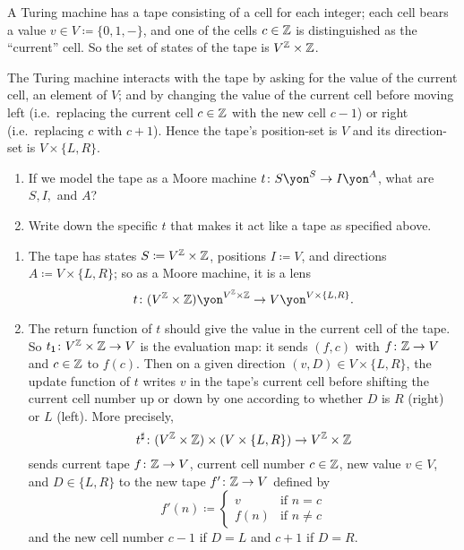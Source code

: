 \documentclass[Book-Poly]{subfiles}
\begin{document}
\begin{exercise}
A Turing machine has a tape consisting of a cell for each integer; each cell bears a value $v\in V\coloneqq\{0,1,-\}$, and one of the cells $c\in\mathbb{Z}$ is distinguished as the ``current'' cell.
So the set of states of the tape is $V^{\mathbb{Z}}\times\mathbb{Z}$.

The Turing machine interacts with the tape by asking for the value of the current cell, an element of $V$; and by changing the value of the current cell before moving left (i.e.\ replacing the current cell $c\in\mathbb{Z}$ with the new cell $c-1$) or right (i.e.\ replacing $c$ with $c+1$).
Hence the tape's position-set is $V$ and its direction-set is $V\times\{L,R\}$.

\begin{enumerate}
	\item If we model the tape as a Moore machine $t\colon S\yon^S\to I\yon^A$, what are $S,I,$ and $A$?
	\item Write down the specific $t$ that makes it act like a tape as specified above.
\qedhere
\end{enumerate}
\begin{solution}
\begin{enumerate}
    \item The tape has states $S\coloneqq V^{\mathbb{Z}} \times \mathbb{Z}$, positions $I\coloneqq V$, and directions $A\coloneqq V\times\{L,R\}$; so as a Moore machine, it is a lens
    \[
        t \colon (V^\zz \times \zz)\yon^{V^\zz \times \zz} \to V\yon^{V \times \{L,R\}}.
    \]
    \item The return function of $t$ should give the value in the current cell of the tape.
    So $t_{\textsf{1}}\colon V^{\mathbb{Z}}\times\mathbb{Z}\to V$ is the evaluation map: it sends $(f,c)$ with $f\colon\mathbb{Z}\to V$ and $c\in\mathbb{Z}$ to $f(c)$.
    Then on a given direction $(v,D)\in V\times\{L,R\}$, the update function of $t$ writes $v$ in the tape's current cell before shifting the current cell number up or down by one according to whether $D$ is $R$ (right) or $L$ (left).
    More precisely,
    \[
        t^\sharp \colon (V^{\mathbb{Z}} \times \mathbb{Z}) \times (V \times \{L,R\}) \to V^{\mathbb{Z}} \times \mathbb{Z}
    \]
    sends current tape $f\colon\mathbb{Z}\to V$, current cell number $c\in\mathbb{Z}$, new value $v \in V$, and $D \in \{L,R\}$ to the new tape $f' \colon \mathbb{Z} \to V$ defined by
    \[
        f'(n)\coloneqq
        \begin{cases}
            v & \text{if } n = c \\
            f(n) & \text{if } n \neq c
        \end{cases}
    \]
    and the new cell number $c-1$ if $D=L$ and $c+1$ if $D=R$.
\end{enumerate}
\end{solution}
\end{exercise}
\end{document}
